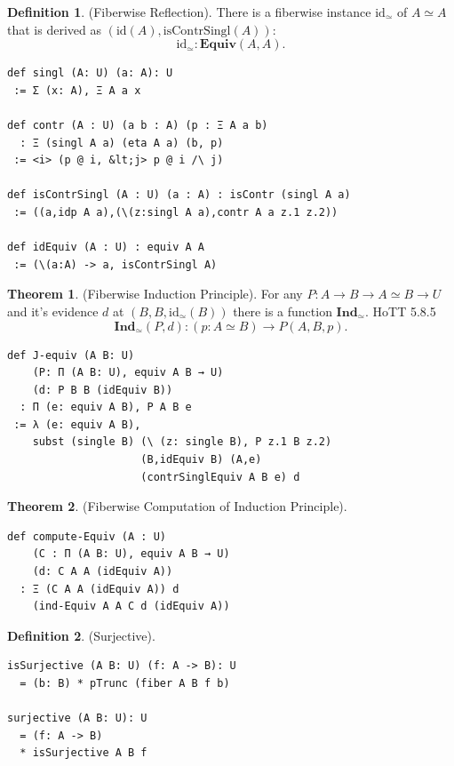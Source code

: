 \documentclass{article}
\theoremstyle{definition}
\newtheorem{definition}{Definition}
\newtheorem{theorem}{Theorem}
\begin{document}
\begin{definition} (Fiberwise Reflection).
There is a fiberwise instance $\mathrm{id_\simeq}$
of $A\simeq A$ that is derived
as $(\mathrm{id}(A),\mathrm{isContrSingl}(A))$:
$$
  \mathrm{id}_\simeq : \mathbf{Equiv}(A,A).
$$
\begin{lstlisting}
def singl (A: U) (a: A): U
 := Σ (x: A), Ξ A a x

def contr (A : U) (a b : A) (p : Ξ A a b)
  : Ξ (singl A a) (eta A a) (b, p)
 := <i> (p @ i, &lt;j> p @ i /\ j)

def isContrSingl (A : U) (a : A) : isContr (singl A a)
 := ((a,idp A a),(\(z:singl A a),contr A a z.1 z.2))

def idEquiv (A : U) : equiv A A
 := (\(a:A) -> a, isContrSingl A)
\end{lstlisting}
\end{definition}

\begin{theorem} (Fiberwise Induction Principle).
For any $P : A \rightarrow B \rightarrow A \simeq B \rightarrow U$
and it's evidence $d$ at $(B,B,\mathrm{id_\simeq}(B))$
there is a function $\mathbf{Ind}_\simeq$. HoTT 5.8.5
$$
  \mathbf{Ind}_\simeq(P,d) : (p: A\simeq B) \rightarrow P(A,B,p).
$$
\begin{lstlisting}
def J-equiv (A B: U)
    (P: Π (A B: U), equiv A B → U)
    (d: P B B (idEquiv B))
  : Π (e: equiv A B), P A B e
 := λ (e: equiv A B),
    subst (single B) (\ (z: single B), P z.1 B z.2)
                     (B,idEquiv B) (A,e)
                     (contrSinglEquiv A B e) d
\end{lstlisting}
\end{theorem}

\begin{theorem} (Fiberwise Computation of Induction Principle).
\begin{lstlisting}
def compute-Equiv (A : U)
    (C : Π (A B: U), equiv A B → U)
    (d: C A A (idEquiv A))
  : Ξ (C A A (idEquiv A)) d
    (ind-Equiv A A C d (idEquiv A))
\end{lstlisting}
\end{theorem}

\begin{definition} (Surjective).
\begin{lstlisting}
isSurjective (A B: U) (f: A -> B): U
  = (b: B) * pTrunc (fiber A B f b)

surjective (A B: U): U
  = (f: A -> B)
  * isSurjective A B f
\end{lstlisting}
\end{definition}
\end{document}
